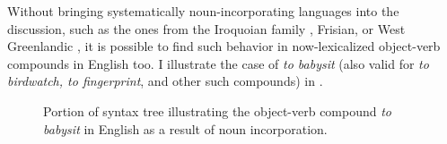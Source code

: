 Without bringing systematically noun-incorporating languages into the discussion, such as the ones from the Iroquoian family \parencite{mithun2009polysynthesis}, Frisian, or West Greenlandic \parencite{Marti2015}, it is possible to find such behavior in now-lexicalized object-verb compounds in English too. I illustrate the case of \textit{to babysit} (also valid for \textit{to birdwatch, to fingerprint}, and other such compounds) in .

\begin{figure}[htb]
\caption{Portion of syntax tree illustrating the object-verb compound \textit{to babysit} in English as a result of noun incorporation.}
\end{figure}

